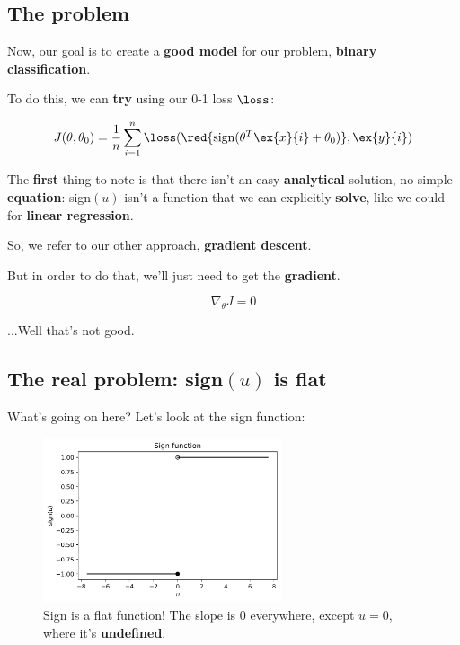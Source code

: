
    \subsection*{The problem}

        Now, our goal is to create a \textbf{good model} for our problem, \textbf{binary classification}.
        
        To do this, we can \textbf{try} using our 0-1 loss $\loss$:
        
        \begin{equation}
            J(\theta, \theta_0) = 
            \frac{1}{n} \sum_{i=1}^n 
            \loss
            (
                \red{
                    \text{sign}(\theta^T\ex{x}{i} + \theta_0)
                    }, 
                \ex{y}{i}
            )
        \end{equation}
        
        The \textbf{first} thing to note is that there isn't an easy \textbf{analytical} solution, no simple \textbf{equation}: sign$(u)$ isn't a function that we can explicitly \textbf{solve}, like we could for \textbf{linear regression}.
            
        So, we refer to our other approach, \textbf{gradient descent}.
        
        But in order to do that, we'll just need to get the \textbf{gradient}.
        
        \begin{equation}
            \nabla_\theta J = 0
        \end{equation}
        
        ...Well that's not good.
        
    \subsection*{The real problem: sign$(u)$ is flat}
    
        What's going on here? Let's look at the sign function:
        
        \begin{figure}[H]
            \centering
            
            \includegraphics[width=70mm,scale=0.5]{images/classification_images/sign_function.png}
            \caption*{Sign is a flat function! The slope is 0 everywhere, except $u=0$, where it's \textbf{undefined}.}
        \end{figure}
        
